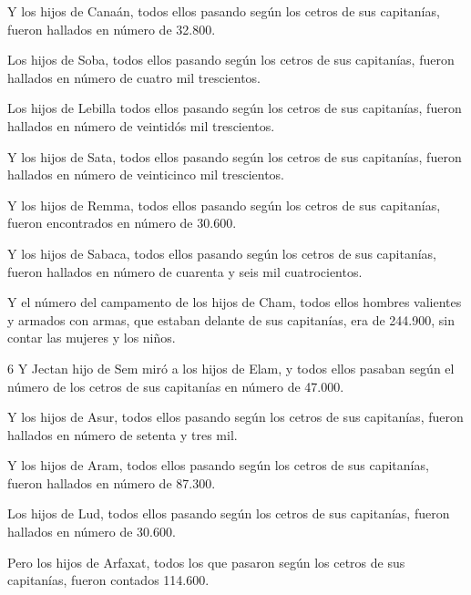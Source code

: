 \par Y los hijos de Canaán, todos ellos pasando según los cetros de sus capitanías, fueron hallados en número de 32.800.

\par Los hijos de Soba, todos ellos pasando según los cetros de sus capitanías, fueron hallados en número de cuatro mil trescientos.

\par Los hijos de Lebilla todos ellos pasando según los cetros de sus capitanías, fueron hallados en número de veintidós mil trescientos.

\par Y los hijos de Sata, todos ellos pasando según los cetros de sus capitanías, fueron hallados en número de veinticinco mil trescientos.

\par Y los hijos de Remma, todos ellos pasando según los cetros de sus capitanías, fueron encontrados en número de 30.600.

\par Y los hijos de Sabaca, todos ellos pasando según los cetros de sus capitanías, fueron hallados en número de cuarenta y seis mil cuatrocientos.

\par Y el número del campamento de los hijos de Cham, todos ellos hombres valientes y armados con armas, que estaban delante de sus capitanías, era de 244.900, sin contar las mujeres y los niños.

\par 6 Y Jectan hijo de Sem miró a los hijos de Elam, y todos ellos pasaban según el número de los cetros de sus capitanías en número de 47.000.

\par Y los hijos de Asur, todos ellos pasando según los cetros de sus capitanías, fueron hallados en número de setenta y tres mil.

\par Y los hijos de Aram, todos ellos pasando según los cetros de sus capitanías, fueron hallados en número de 87.300.

\par Los hijos de Lud, todos ellos pasando según los cetros de sus capitanías, fueron hallados en número de 30.600.

\par [El número de los hijos de Cham era setenta y tres mil.]

\par Pero los hijos de Arfaxat, todos los que pasaron según los cetros de sus capitanías, fueron contados 114.600.

